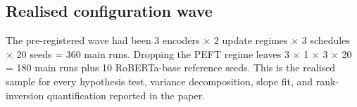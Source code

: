 \subsection{Realised configuration wave}

The pre-registered wave had been 3 encoders $\times$ 2 update regimes
$\times$ 3 schedules $\times$ 20 seeds = 360 main runs. Dropping the
PEFT regime leaves 3 $\times$ 1 $\times$ 3 $\times$ 20 = 180 main
runs plus 10 RoBERTa-base reference seeds. This is the realised
sample for every hypothesis test, variance decomposition, slope fit,
and rank-inversion quantification reported in the paper.